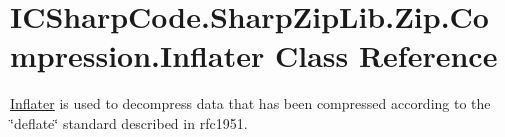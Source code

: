 \hypertarget{class_i_c_sharp_code_1_1_sharp_zip_lib_1_1_zip_1_1_compression_1_1_inflater}{}\section{I\+C\+Sharp\+Code.\+Sharp\+Zip\+Lib.\+Zip.\+Compression.\+Inflater Class Reference}
\label{class_i_c_sharp_code_1_1_sharp_zip_lib_1_1_zip_1_1_compression_1_1_inflater}


\hyperlink{class_i_c_sharp_code_1_1_sharp_zip_lib_1_1_zip_1_1_compression_1_1_inflater}{Inflater} is used to decompress data that has been compressed according to the \char`\"{}deflate\char`\"{} standard described in rfc1951.  



